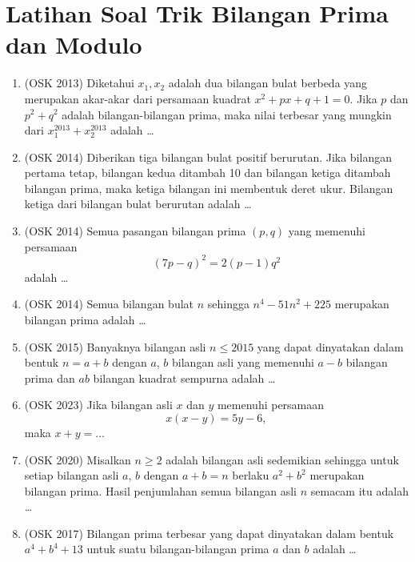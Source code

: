 \documentclass[12pt, letter]{scrartcl}
\begin{document}
\section{Latihan Soal Trik Bilangan Prima dan Modulo}
\begin{enumerate}
        \item (OSK 2013) Diketahui $x_1,x_2$ adalah dua bilangan bulat berbeda yang merupakan akar-akar dari persamaan kuadrat $x^2+px+q+1=0$. Jika $p$ dan $p^2+q^2$ adalah bilangan-bilangan prima, maka nilai terbesar yang mungkin dari $x_1^{2013}+x_2^{2013}$ adalah \dots
        
        \item (OSK 2014) Diberikan tiga bilangan bulat positif berurutan. Jika bilangan pertama tetap, bilangan kedua ditambah 10 dan bilangan ketiga ditambah bilangan prima, maka ketiga bilangan ini membentuk deret ukur. Bilangan ketiga dari bilangan bulat berurutan adalah \dots
        
        \item (OSK 2014) Semua pasangan bilangan prima $(p,q)$ yang memenuhi persamaan
        $$(7p-q)^2=2(p-1)q^2$$
        adalah \dots
        
        \item (OSK 2014) Semua bilangan bulat $n$ sehingga $n^4-51n^2+225$ merupakan bilangan prima adalah \dots

        \item (OSK 2015) Banyaknya bilangan asli $n \leq 2015$ yang dapat dinyatakan dalam bentuk $n = a + b$ dengan $a$, $b$ bilangan asli yang memenuhi $a - b$ bilangan prima dan $ab$ bilangan kuadrat sempurna adalah \ldots

        
        \item (OSK 2023) Jika bilangan asli $x$ dan $y$ memenuhi persamaan
        $$x(x-y)=5y-6,$$
        maka $x+y=\ldots$

        \item (OSK 2020) Misalkan $n \geq 2$ adalah bilangan asli sedemikian sehingga untuk setiap bilangan asli $a$, $b$ dengan $a + b = n$ berlaku $a^2 + b^2$ merupakan bilangan prima. Hasil penjumlahan semua bilangan asli $n$ semacam itu adalah \ldots

        \item (OSK 2017) Bilangan prima terbesar yang dapat dinyatakan dalam bentuk $a^4+b^4+13$ untuk suatu bilangan-bilangan prima $a$ dan $b$ adalah \ldots
\end{enumerate}
\end{document}
